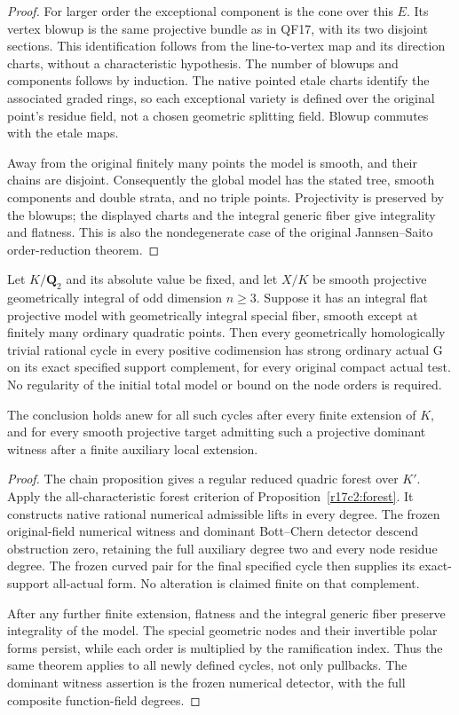 \begin{proof}
For larger order the exceptional component is the cone
over this $E$. Its vertex blowup is the same projective
bundle as in QF17, with its two disjoint sections. This
identification follows from the line-to-vertex map and
its direction charts, without a characteristic hypothesis.
The number of blowups and components follows by induction.
The native pointed etale charts identify the associated
graded rings, so each exceptional variety is defined over
the original point's residue field, not a chosen geometric
splitting field. Blowup commutes with the etale maps.

Away from the original finitely many points the model is
smooth, and their chains are disjoint. Consequently the
global model has the stated tree, smooth components and
double strata, and no triple points. Projectivity is
preserved by the blowups; the displayed charts and the
integral generic fiber give integrality and flatness.
This is also the nondegenerate case of the original
Jannsen--Saito order-reduction theorem.
\end{proof}

\begin{theorem}
\label{r17c2:actual}
Let $K/\mathbf Q_2$ and its absolute value be fixed, and
let $X/K$ be smooth projective geometrically integral of
odd dimension $n\ge3$. Suppose it has an integral flat
projective model with geometrically integral special fiber,
smooth except at finitely many ordinary quadratic points.
Then every geometrically homologically trivial rational
cycle in every positive codimension has strong ordinary
actual G on its exact specified support complement, for
every original compact actual test. No regularity of the
initial total model or bound on the node orders is required.

The conclusion holds anew for all such cycles after every
finite extension of $K$, and for every smooth projective
target admitting such a projective dominant witness after
a finite auxiliary local extension.
\end{theorem}

\begin{proof}
The chain proposition gives a regular reduced quadric
forest over $K'$. Apply the all-characteristic forest
criterion of Proposition~\ref{r17c2:forest}. It constructs
native rational numerical admissible lifts in every degree.
The frozen original-field numerical witness and dominant
Bott--Chern detector descend obstruction zero, retaining
the full auxiliary degree two and every node residue
degree. The frozen curved pair for the final specified
cycle then supplies its exact-support all-actual form.
No alteration is claimed finite on that complement.

After any further finite extension, flatness and the
integral generic fiber preserve integrality of the model.
The special geometric nodes and their invertible polar
forms persist, while each order is multiplied by the
ramification index. Thus the same theorem applies to all
newly defined cycles, not only pullbacks. The dominant
witness assertion is the frozen numerical detector, with
the full composite function-field degrees.
\end{proof}

